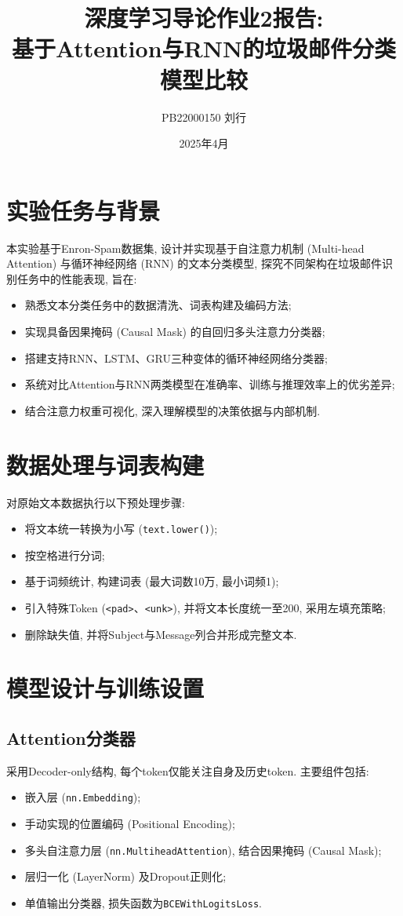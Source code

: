 \documentclass[11pt]{article}
\title{\textbf{深度学习导论作业2报告:\\
基于Attention与RNN的垃圾邮件分类模型比较}}
\author{PB22000150 刘行}
\date{2025年4月}
\begin{document}
\maketitle

\tableofcontents

\newpage

\section{实验任务与背景}
本实验基于Enron-Spam数据集, 设计并实现基于自注意力机制 (Multi-head Attention) 与循环神经网络 (RNN) 的文本分类模型, 探究不同架构在垃圾邮件识别任务中的性能表现, 旨在:

\begin{itemize}
	\item 熟悉文本分类任务中的数据清洗、词表构建及编码方法;
	\item 实现具备因果掩码 (Causal Mask) 的自回归多头注意力分类器;
	\item 搭建支持RNN、LSTM、GRU三种变体的循环神经网络分类器;
	\item 系统对比Attention与RNN两类模型在准确率、训练与推理效率上的优劣差异;
	\item 结合注意力权重可视化, 深入理解模型的决策依据与内部机制.
\end{itemize}

\section{数据处理与词表构建}
对原始文本数据执行以下预处理步骤:
\begin{itemize}
	\item 将文本统一转换为小写 (\texttt{text.lower()});
	\item 按空格进行分词;
	\item 基于词频统计, 构建词表 (最大词数10万, 最小词频1);
	\item 引入特殊Token (\texttt{<pad>}、\texttt{<unk>}), 并将文本长度统一至200, 采用左填充策略;
	\item 删除缺失值, 并将Subject与Message列合并形成完整文本.
\end{itemize}

\section{模型设计与训练设置}
\subsection{Attention分类器}
采用Decoder-only结构, 每个token仅能关注自身及历史token. 主要组件包括:
\begin{itemize}
	\item 嵌入层 (\texttt{nn.Embedding});
	\item 手动实现的位置编码 (Positional Encoding);
	\item 多头自注意力层 (\texttt{nn.MultiheadAttention}), 结合因果掩码 (Causal Mask);
	\item 层归一化 (LayerNorm) 及Dropout正则化;
	\item 单值输出分类器, 损失函数为\texttt{BCEWithLogitsLoss}.
\end{itemize}
\end{document}
